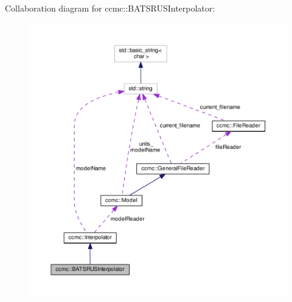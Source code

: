 Collaboration diagram for ccmc\-:\-:B\-A\-T\-S\-R\-U\-S\-Interpolator\-:
\nopagebreak
\begin{figure}[H]
\begin{center}
\leavevmode
\includegraphics[width=350pt]{classccmc_1_1_b_a_t_s_r_u_s_interpolator__coll__graph}
\end{center}
\end{figure}
